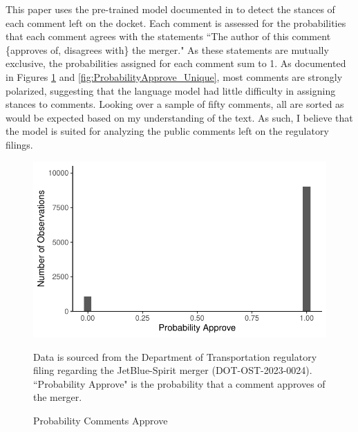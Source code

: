 \documentclass{article}
\begin{document}
\begin{appendices}
This paper uses the pre-trained model documented in \citet{laurer_less_2024} to detect the stances of each comment left on the docket. Each comment is assessed for the probabilities that each comment agrees with the statements ``The author of this comment \{approves of, disagrees with\} the merger." As these statements are mutually exclusive, the probabilities assigned for each comment sum to 1. As documented in Figures \ref{fig:ProbabilityApprove} and \ref{fig:ProbabilityApprove_Unique}, most comments are strongly polarized, suggesting that the language model had little difficulty in assigning stances to comments. Looking over a sample of fifty comments, all are sorted as would be expected based on my understanding of the text. As such, I believe that the model is suited for analyzing the public comments left on the regulatory filings.  

	\begin{figure}
		\caption{Probability Comments Approve}
		\label{fig:ProbabilityApprove}
        \begin{center}
        \includegraphics{05.Figures/stance_strength_graph}
        \end{center}
		\begin{minipage}{\textwidth} 
			{\footnotesize Data is sourced from the Department of Transportation regulatory filing regarding the JetBlue-Spirit merger (DOT-OST-2023-0024). ``Probability Approve" is the probability that a comment approves of the merger.} 
		\end{minipage}
	\end{figure}
	

\end{appendices}
\end{document}
